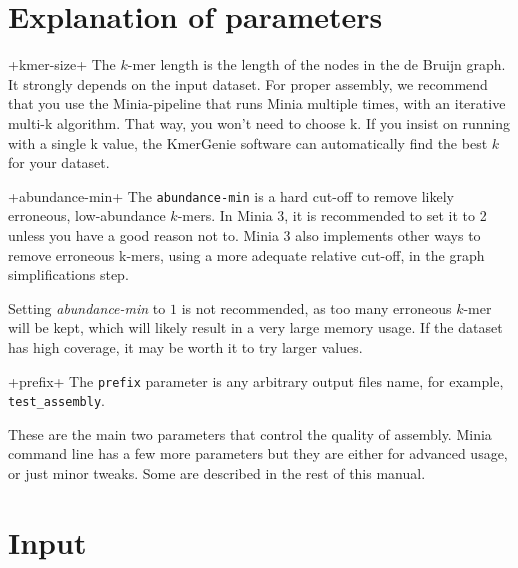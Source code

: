 \documentclass[a4paper]{article}
\begin{document}
\section{Explanation of parameters}
\begin{description}

\vitem+kmer-size+
The $k$-mer length is the length of the nodes in the de Bruijn graph. It strongly depends on the input dataset. For proper assembly, we recommend that you use the Minia-pipeline that runs Minia multiple times, with an iterative multi-k algorithm. That way, you won't need to choose k. If you insist on running with a single k value, the KmerGenie software can automatically find the best $k$ for your dataset.

\vitem+abundance-min+
The \verb+abundance-min+ is a hard cut-off to remove likely erroneous, low-abundance $k$-mers. In Minia 3, it is recommended to set it to 2 unless you have a good reason not to. Minia 3 also implements other ways to remove erroneous k-mers, using a more adequate relative cut-off, in the graph simplifications step.

Setting \emph{abundance-min} to $1$ is not recommended, as too many erroneous $k$-mer will be kept, which will likely result in a very large memory usage. If the dataset has high coverage, it may be worth it to try larger values. 

\vitem+prefix+
The \verb+prefix+ parameter is any arbitrary output files name, for example, \verb+test_assembly+.

\end{description}

These are the main two parameters that control the quality of assembly. Minia command line has a few more parameters but they are either for advanced usage, or just minor tweaks. Some are described in the rest of this manual.


\section{Input}
\end{document}
